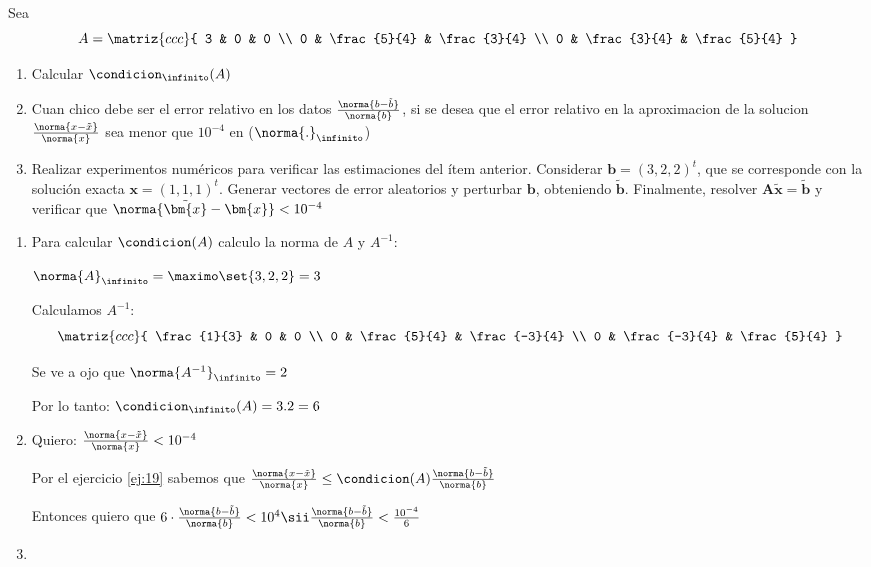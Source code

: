 \begin{enunciado}{\ejercicio}
  Sea
  $$
    A =
    \matriz{ccc}{
      3 & 0 & 0 \\
      0 & \frac{5}{4} & \frac{3}{4} \\
      0 & \frac{3}{4} & \frac{5}{4}
    }$$
  \begin{enumerate}[label=(\alph*)]
    \item Calcular $\condicion_\infinito(A)$
    \item
          Cuan chico debe ser el error relativo en los datos $\frac{\norma{b-\tilde{b}}}{\norma{b}}$, si se desea que el error relativo en
          la aproximacion de la solucion $\frac{\norma{x-\tilde{x}}}{\norma{x}}$ sea menor que $10^{-4}$ en ($\norma{.}_\infinito$)

    \item Realizar experimentos numéricos para verificar las estimaciones del ítem anterior. Considerar $\bm{b} = (3,2,2)^t$, que se corresponde
          con la solución exacta $\bm{x} = (1,1,1)^t$. Generar vectores de error aleatorios y perturbar $\bm{b}$, obteniendo $\tilde{\bm{b}}$.
          Finalmente, resolver $\bm{A}\bm{\tilde{x}} = \tilde{\bm{b}}$ y verificar que $\norma{\tilde{\bm{x}} - \bm{x}} < 10^{-4}$
  \end{enumerate}

\end{enunciado}

\medskip
\begin{enumerate}[label=(\alph*)]
  \item Para calcular $\condicion(A)$ calculo la norma de $A$ y $A^{-1}$:

        $\norma{A}_\infinito = \maximo\set{3,2,2} = 3$

        Calculamos $A^{-1}$:
        $$
          \matriz{ccc}{
            \frac{1}{3} & 0 & 0 \\
            0 & \frac{5}{4} & \frac{-3}{4} \\
            0 & \frac{-3}{4} & \frac{5}{4}
          }
        $$

        Se ve a ojo que $\norma{A^{-1}}_\infinito = 2 $

        Por lo tanto: $\condicion_\infinito(A) = 3.2 = 6$

  \item
        Quiero: $\frac{\norma{x - \tilde{x}}}{\norma{x}} < 10^{-4}$

        Por el ejercicio \ref{ej:19} sabemos que $\frac{\norma{x-\tilde{x}}}{\norma{x}} \leq \condicion(A) \frac{\norma{b-\tilde{b}}}{\norma{b}}$

        Entonces quiero que $6 \cdot \frac{\norma{b-\tilde{b}}}{\norma{b}} < 10^4
          \sii
          \frac{\norma{b-\tilde{b}}}{\norma{b}} < \frac{10^{-4}}{6}$

  \item \hacer
\end{enumerate}

\begin{aportes}
  \item {}
\end{aportes}
